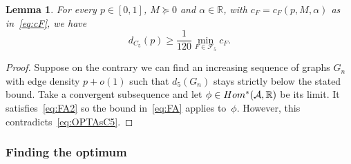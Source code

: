 \documentclass[12pt]{article}
\newtheorem{lemma}[theorem]{Lemma}
\theoremstyle{definition}
\theoremstyle{remark}
\newcommand{\C}[1]{{\protect\mathcal{#1}}}
\newcommand{\I}[1]{{\mathbb #1}}
\renewcommand{\ge}{\geqslant}
\renewcommand{\succeq}{\succcurlyeq}
\begin{document}
\begin{lemma}\label{lm:lower} For every $p\in[0,1]$, $M\succeq 0$ and $\alpha\in\I R$, with $c_F=c_F(p,M,\alpha)$ as in~\eqref{eq:cF}, we have 
	$$
	d_{C_5}(p)\ge \frac1{120} \min_{F \in \mathcal{F}_5}  c_F.
	$$
	\end{lemma}
\begin{proof} Suppose on the contrary we can find an increasing sequence of graphs $G_n$ with edge density $p+o(1)$ such that $d_5(G_n)$  stays strictly below the stated bound. Take a convergent subsequence and let $\phi\in Hom^*(\C A,\I R)$ be its limit. It satisfies~\eqref{eq:FA2} so the bound in~\eqref{eq:FA} applies to~$\phi$. However, this contradicts~\eqref{eq:OPTAsC5}.\end{proof}

\subsubsection{Finding the optimum}\label{subsec:nice_p}
\end{document}

